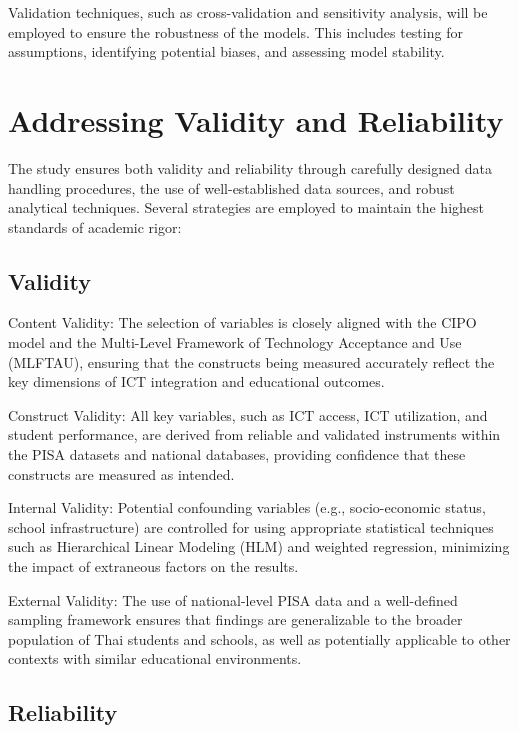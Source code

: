 \documentclass[
]{article}
\begin{document}
Validation techniques, such as cross-validation and sensitivity
analysis, will be employed to ensure the robustness of the models. This
includes testing for assumptions, identifying potential biases, and
assessing model stability.

\hypertarget{addressing-validity-and-reliability}{%
\section{Addressing Validity and
Reliability}\label{addressing-validity-and-reliability}}

The study ensures both validity and reliability through carefully
designed data handling procedures, the use of well-established data
sources, and robust analytical techniques. Several strategies are
employed to maintain the highest standards of academic rigor:

\hypertarget{validity}{%
\subsection{Validity}\label{validity}}

Content Validity: The selection of variables is closely aligned with the
CIPO model and the Multi-Level Framework of Technology Acceptance and
Use (MLFTAU), ensuring that the constructs being measured accurately
reflect the key dimensions of ICT integration and educational outcomes.

Construct Validity: All key variables, such as ICT access, ICT
utilization, and student performance, are derived from reliable and
validated instruments within the PISA datasets and national databases,
providing confidence that these constructs are measured as intended.

Internal Validity: Potential confounding variables (e.g., socio-economic
status, school infrastructure) are controlled for using appropriate
statistical techniques such as Hierarchical Linear Modeling (HLM) and
weighted regression, minimizing the impact of extraneous factors on the
results.

External Validity: The use of national-level PISA data and a
well-defined sampling framework ensures that findings are generalizable
to the broader population of Thai students and schools, as well as
potentially applicable to other contexts with similar educational
environments.

\hypertarget{reliability}{%
\subsection{Reliability}\label{reliability}}
\end{document}
